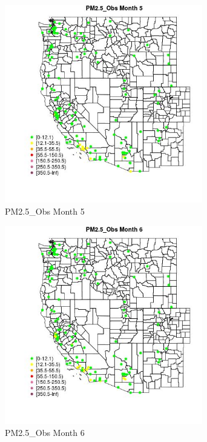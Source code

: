 \begin{figure} 
\centering  
\includegraphics[width=0.77\textwidth]{Code_Outputs/Report_ML_input_PM25_Step4_part_e_de_duplicated_aves_MapObsMo5PM25_Obs.jpg} 
\caption{\label{fig:Report_ML_input_PM25_Step4_part_e_de_duplicated_avesMapObsMo5PM25_Obs}PM2.5_Obs Month 5} 
\end{figure} 
 

\begin{figure} 
\centering  
\includegraphics[width=0.77\textwidth]{Code_Outputs/Report_ML_input_PM25_Step4_part_e_de_duplicated_aves_MapObsMo6PM25_Obs.jpg} 
\caption{\label{fig:Report_ML_input_PM25_Step4_part_e_de_duplicated_avesMapObsMo6PM25_Obs}PM2.5_Obs Month 6} 
\end{figure} 
 

